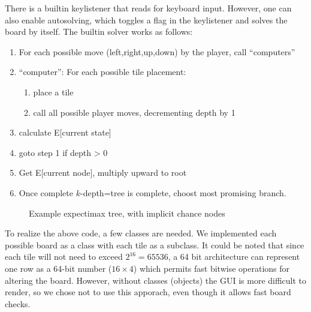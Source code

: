 \documentclass[journal]{IEEEtran}
\begin{document}
There is a builtin keylistener that reads for keyboard input. However, one can also
enable autosolving, which toggles a flag in the keylistener and solves the board by
itself. The builtin solver works as follows:
\begin{enumerate}
    \item For each possible move (left,right,up,down) by the player, call ``computers''
    \item ``computer'': For each possible tile placement:
        \begin{enumerate}
            \item place a tile
            \item call all possible player moves,
                decrementing depth by 1
        \end{enumerate}
    \item calculate E[current state]
    \item \dotso{} goto step 1 if depth \textgreater{} 0
    \item Get E[current node], multiply upward to root
    \item Once complete $k$-depth=tree is complete, choost most promising branch.
\end{enumerate}

\begin{figure}[Hb!]
\caption{Example expectimax tree, with implicit chance nodes}
\end{figure}

To realize the above code, a few classes are needed. We implemented each 
possible board as a class with each tile as a subclass. It could be noted that since each tile will not need
to exceed $2^16 = 65536$, a 64 bit architecture can represent one row as a 64-bit number
($16 \times 4$) which permits fast bitwise operations for altering the board.
However, without classes (objects) the GUI is more difficult to render, so we 
chose not to use this apporach, even though it allows fast board checks.
\end{document}
